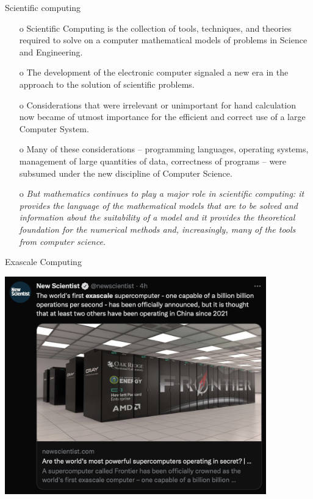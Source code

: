 \documentclass{beamer}
\begin{document}
\begin{frame}{Scientific computing}
  \small
  \begin{itemize}
    \item[o] Scientific Computing is the collection of tools,
    techniques, and theories required to solve on a computer
    mathematical models of problems in Science and Engineering.
    \item[o] The development of the electronic computer
    signaled a new era in the approach to the solution of scientific
    problems.
    \item[o] Considerations that were irrelevant
    or unimportant for hand calculation now became of utmost
    importance for the efficient and correct use of a large Computer
    System.
    \item[o] Many of these considerations –
    programming languages, operating systems, management of large
    quantities of data, correctness of programs – were subsumed under
    the new discipline of Computer Science.
    \item[o]
    \textit{But mathematics continues to play a major role in
      scientific computing: it provides the language of the
      mathematical models that are to be solved and information about
      the suitability of a model and it provides the theoretical
      foundation for the numerical methods and, increasingly, many of
      the tools from computer science.}
  \end{itemize}
  
\end{frame}

\begin{frame}{Exascale Computing}
  \centerline{\includegraphics[width=0.85\textwidth]{figures/Frontier}}
\end{frame}
\end{document}
